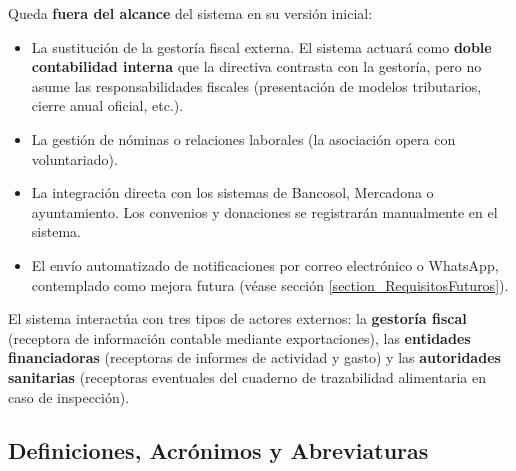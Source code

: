 \noindent Queda \textbf{fuera del alcance} del sistema en su versión inicial:
\begin{itemize}
    \item La sustitución de la gestoría fiscal externa. El sistema actuará como \textbf{doble
      contabilidad interna} que la directiva contrasta con la gestoría, pero no
      asume las responsabilidades fiscales (presentación de modelos tributarios,
      cierre anual oficial, etc.).

    \item La gestión de nóminas o relaciones laborales (la asociación opera con
      voluntariado).

    \item La integración directa con los sistemas de Bancosol, Mercadona o
      ayuntamiento. Los convenios y donaciones se registrarán manualmente en el
      sistema.
       
    \item El envío automatizado de notificaciones por correo electrónico o WhatsApp,
      contemplado como mejora futura (véase sección \vref{section_RequisitosFuturos}). %
\end{itemize}
\par
El sistema interactúa con tres tipos de actores externos: la \textbf{gestoría fiscal}
(receptora de información contable mediante exportaciones), las \textbf{entidades
financiadoras} (receptoras de informes de actividad y gasto) y las
\textbf{autoridades sanitarias} (receptoras eventuales del cuaderno de trazabilidad
alimentaria en caso de inspección).

\subsection{Definiciones, Acrónimos y Abreviaturas}\label{section_DefinicionesAcronimos}

